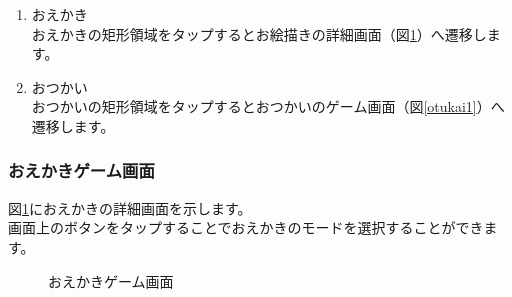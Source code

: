 \documentclass[a4j]{jarticle}
\begin{document}
\begin{enumerate}
  \renewcommand{\labelenumi}{\textcircled{\scriptsize \theenumi}}
\item おえかき\\
  おえかきの矩形領域をタップするとお絵描きの詳細画面（図\ref{oekaki}）へ遷移します。
\item おつかい\\
  おつかいの矩形領域をタップするとおつかいのゲーム画面（図\ref{otukai1}）へ遷移します。
\end{enumerate}

\newpage
\subsubsection{おえかきゲーム画面}
図\ref{oekaki}におえかきの詳細画面を示します。\\
画面上のボタンをタップすることでおえかきのモードを選択することができます。\\

\begin{figure}[H]
    \begin{center}
    \caption {おえかきゲーム画面}
    \label{oekaki}
    \end{center}
\end{figure}
\end{document}
